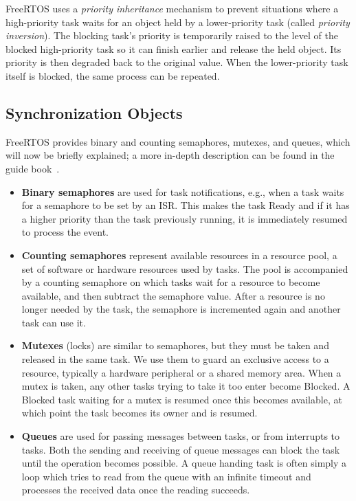 FreeRTOS uses a \textit{priority inheritance} mechanism to prevent situations where a high-priority task waits for an object held by a lower-priority task (called \textit{priority inversion}). The blocking task's priority is temporarily raised to the level of the blocked high-priority task so it can finish earlier and release the held object. Its priority is then degraded back to the original value. When the lower-priority task itself is blocked, the same process can be repeated.

\subsection{Synchronization Objects}

FreeRTOS provides binary and counting semaphores, mutexes, and queues, which will now be briefly explained; a more in-depth description can be found in the guide book~\cite{freertos-book}.

\begin{itemize}
	\item \textbf{Binary semaphores} are used for task notifications, e.g., when a task waits for a semaphore to be set by an \gls{ISR}. This makes the task Ready and if it has a higher priority than the task previously running, it is immediately resumed to process the event.

	\item  \textbf{Counting semaphores} represent available resources in a resource pool, a set of software or hardware resources used by tasks. The pool is accompanied by a counting semaphore on which tasks wait for a resource to become available, and then subtract the semaphore value. After a resource is no longer needed by the task, the semaphore is incremented again and another task can use it.

	\item \textbf{Mutexes} (locks) are similar to semaphores, but they must be taken and released in the same task. We use them to
	guard an exclusive access to a resource, typically a hardware peripheral or a shared memory area. When a mutex is taken, any other tasks trying to take it too enter become Blocked. A Blocked task waiting for a mutex is resumed once this becomes available, at which point the task becomes its owner and is resumed.

	\item \textbf{Queues} are used for passing messages between tasks, or from interrupts to tasks. Both the sending and receiving of queue messages can block the task until the operation becomes possible. A queue handing task is often simply a loop which tries to read from the queue with an infinite timeout and processes the received data once the reading succeeds.
\end{itemize}

